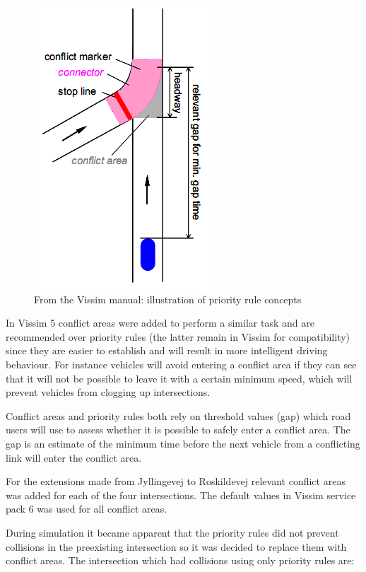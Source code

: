 \begin{figure}[htbp]
\centering
\includegraphics[scale=0.5]{priority_rules.png} 
\caption{From the Vissim manual: illustration of priority rule concepts}
\label{fig:priority_rules}
\end{figure}

In Vissim 5 conflict areas were added to perform a similar task and are recommended over priority rules (the latter remain in Vissim for compatibility) since they are easier to establish and will result in more intelligent driving behaviour. For instance vehicles will avoid entering a conflict area if they can see that it will not be possible to leave it with a certain minimum speed, which will prevent vehicles from clogging up intersections.

Conflict areas and priority rules both rely on threshold values (gap) which road users will use to assess whether it is possible to safely enter a conflict area. The gap is an estimate of the minimum time before the next vehicle from a conflicting link will enter the conflict area.

For the extensions made from Jyllingevej to Roskildevej relevant conflict areas was added for each of the four intersections. The default values in Vissim service pack 6 was used for all conflict areas.

During simulation it became apparent that the priority rules did not prevent collisions in the preexisting intersection so it was decided to replace them with conflict areas. The intersection which had collisions using only priority rules are:

